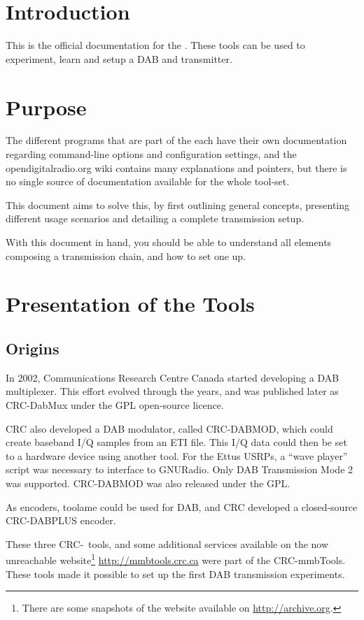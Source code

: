 \section{Introduction}
This is the official documentation for the \mmbtools. These tools can be used to
experiment, learn and setup a DAB and \dabplus transmitter.

\section{Purpose}
The different programs that are part of the \mmbtools each have their own
documentation regarding command-line options and configuration settings, and the
opendigitalradio.org wiki
contains many explanations and pointers, but there is
no single source of documentation available for the whole tool-set.

This document aims to solve this, by first outlining general concepts,
presenting different usage scenarios and detailing a complete transmission
setup.

With this document in hand, you should be able to understand all elements
composing a \mmbtools transmission chain, and how to set one up.

\section{Presentation of the Tools}
\subsection{Origins}
In 2002, Communications Research Centre Canada
started developing a DAB multiplexer. This effort evolved through the years, and
was published later as \mbox{CRC-DabMux} under the GPL
open-source licence.

CRC also developed a DAB modulator, called \mbox{CRC-DABMOD}, which could create
baseband I/Q samples from an ETI file. This I/Q data could then be set to
a hardware device using another tool. For the Ettus USRPs, a ``wave player''
script was necessary to interface to GNURadio. Only DAB Transmission Mode 2 was
supported. \mbox{CRC-DABMOD} was also released under the GPL.

As encoders, toolame could be used for DAB, and CRC developed a closed-source
\mbox{CRC-DABPLUS} \dabplus encoder.

These three CRC-~tools, and some additional services available on the now
unreachable website\footnote{There are some snapshots of the website available
    on \url{http://archive.org}.} \url{http://mmbtools.crc.ca} were
part of the \mbox{CRC-mmbTools}. These tools made it possible to set up the
first DAB transmission experiments.

